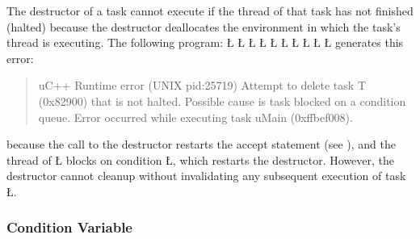 \documentclass[openright,twoside]{report}
\begin{document}
The destructor of a task cannot execute if the thread of that task has not finished (halted) because the destructor deallocates the environment in which the task's thread is executing.
The following program:
\LGinlinefalse\LGbegin\lgrinde
\L{}
\L{\LB{}}
\L{\LB{}}
\L{\LB{}}
\CE{}\L{\LB{}}
\CE{}\L{\LB{}}
\L{\LB{\};}}
\L{}
\L{\LB{}}
\L{}
\CE{}\endlgrinde\LGend
generates this error:
\begin{quote}
\BGfont
uC++ Runtime error (UNIX pid:25719) Attempt to delete task T (0x82900) that is not halted.
Possible cause is task blocked on a condition queue.
Error occurred while executing task uMain (0xffbef008).
\end{quote}
because the call to the destructor restarts the accept statement (see ), and the thread of \LGinlinetrue\LGbegin\lgrinde\L{}\endlgrinde\LGend{} blocks on condition \LGinlinetrue\LGbegin\lgrinde\L{}\endlgrinde\LGend{}, which restarts the destructor.
However, the destructor cannot cleanup without invalidating any subsequent execution of task \LGinlinetrue\LGbegin\lgrinde\L{}\endlgrinde\LGend{}.


\subsubsection{Condition Variable}
\end{document}
